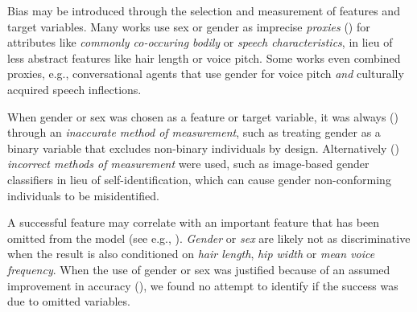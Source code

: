 \documentclass[nonacm,sigconf,review,balance=false]{acmart}
\begin{document}
 Bias may be introduced through the selection and measurement of features and target variables.
Many works use sex or gender as imprecise \emph{proxies} (\var) for attributes like \emph{commonly co-occuring bodily} or \emph{speech characteristics}, in lieu of less abstract features like hair length or voice pitch. Some works even combined proxies, e.g., conversational agents that use gender for voice pitch \emph{and} culturally acquired speech inflections.

When gender or sex was chosen as a feature or target variable, it was always (\binary) through an \emph{inaccurate method of measurement}, such as treating gender as a binary variable that excludes non-binary individuals by design. Alternatively (\classifier) \emph{incorrect methods of measurement} were used, such as image-based gender classifiers in lieu of self-identification, which can cause gender non-conforming individuals to be misidentified.

 A successful feature may correlate with an important feature that has been omitted from the model (see e.g., \cite{clarke2005phantom}). \emph{Gender} or \emph{sex} are likely not as discriminative when the result is also conditioned on \emph{hair length}, \emph{hip width} or \emph{mean voice frequency}. When the use of gender or sex was justified because of an assumed improvement in accuracy (\var), we found no attempt to identify if the success was due to omitted variables.
\end{document}
